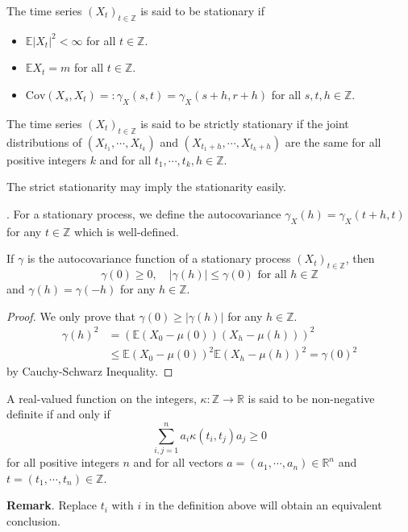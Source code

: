 \begin{definition}
    [Stationarity] The time series $(X_t)_{t\in\mathbb{Z}}$ is said to be stationary if
    \begin{itemize}
        \item $\mathbb{E}|X_t|^2 < \infty$ for all $t\in\mathbb{Z}$.
        \item $\mathbb{E}X_t = m$ for all $t\in\mathbb{Z}$.
        \item $\text{Cov}(X_s,X_t)=:\gamma_X(s,t) = \gamma_X(s+h,r+h)$ for all $s,t,h\in\mathbb{Z}$.    
        \end{itemize}
\end{definition}

\begin{definition}
     The time series $(X_t)_{t\in\mathbb{Z}}$ is said to be
strictly stationary if the joint distributions of $(X_{t_1}, \cdots , X_{t_k})$ and $(X_{t_1+h}, \cdots , X_{t_k+h})$
are the same for all positive integers $k$ and for all $t_1, \cdots , t_k, h \in \mathbb{Z}$. 
\end{definition}

The strict stationarity may imply the stationarity easily.

\begin{definition}
    . For a stationary process, we define the autocovariance $\gamma_X(h) = \gamma_X(t+h,t)$ for any $t\in\mathbb{Z}$ which is well-defined.\par If $\gamma$ is the autocovariance function of a stationary process $(X_t)_{t\in\mathbb{Z}}$, then
    \[
    \gamma(0) \geq 0, \quad |\gamma(h)| \leq \gamma(0)\text{ for all }h\in\mathbb{Z}
    \]
    and $\gamma(h) =  \gamma(-h)$ for any $h\in\mathbb{Z}$.
\end{definition}
\begin{proof}
    We only prove that $\gamma(0) \geq |\gamma(h)|$ for any $h\in\mathbb{Z}$.
    \[
    \begin{aligned}
        \gamma(h)^2 &= \left(\mathbb{E}(X_0-\mu(0))(X_{h} - \mu(h))\right)^2 \\
        &\leq \mathbb{E}(X_0-\mu(0))^2\mathbb{E}(X_h-\mu(h))^2 = \gamma(0)^2
    \end{aligned}
    \]
    by Cauchy-Schwarz Inequality.
\end{proof}

\begin{definition}
     A real-valued function on the
integers, $\kappa : \mathbb{Z} \to \mathbb{R}$ is said to be non-negative definite if and only if 
\[\sum\limits_{i,j=1}^n a_i\kappa(t_i,t_j)a_j \geq 0\]
for all positive integers $n$ and for all vectors $a = (a_1 , \cdots , a_n) \in \mathbb{R}^n$ and $t =
(t_1, \cdots , t_n) \in \mathbb{Z}$. 
\end{definition}
\textbf{Remark}. Replace $t_i$ with $i$ in the definition above will obtain an equivalent conclusion.

